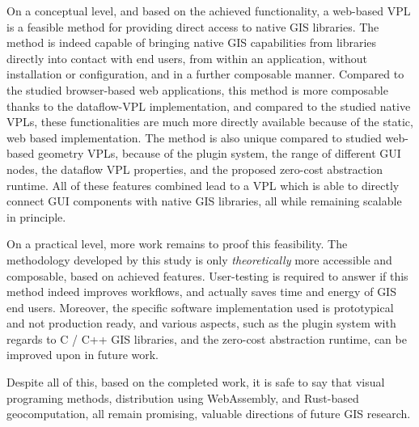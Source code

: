 On a conceptual level, and based on the achieved functionality, a web-based VPL is a feasible method for providing direct access to native \ac{GIS} libraries.
The method is indeed capable of bringing native GIS capabilities from libraries directly into contact with end users, from within an application, without installation or configuration, and in a further composable manner. 
Compared to the studied browser-based web applications, this method is more composable thanks to the dataflow-VPL implementation, 
and compared to the studied native VPLs, these functionalities are much more directly available because of the static, web based implementation.
The method is also unique compared to studied web-based geometry VPLs, because of the plugin system, the range of different \ac{GUI} nodes, the dataflow VPL properties, and the proposed zero-cost abstraction runtime. 
All of these features combined lead to a VPL which is able to directly connect \ac{GUI} components with native \ac{GIS} libraries, all while remaining scalable in principle.

On a practical level, more work remains to proof this feasibility.
The methodology developed by this study is only \emph{theoretically} more accessible and composable, based on achieved features.
User-testing is required to answer if this method indeed improves workflows, and actually saves time and energy of \ac{GIS} end users. 
Moreover, the specific software implementation used is prototypical and not production ready, and various aspects, such as the plugin system with regards to C / C++ \ac{GIS} libraries, and the zero-cost abstraction runtime, can be improved upon in future work.

Despite all of this, based on the completed work, it is safe to say that visual programing methods, distribution using WebAssembly, and Rust-based geocomputation, all remain promising, valuable directions of future \ac{GIS} research.





